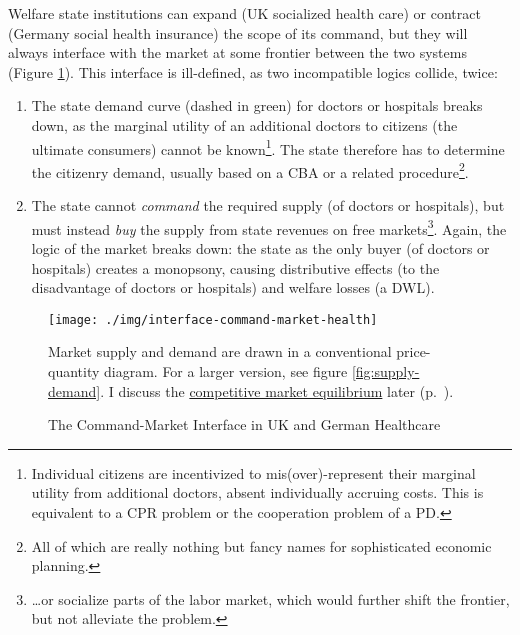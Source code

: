 Welfare state institutions can expand (UK socialized health care) or contract (Germany social health insurance) the scope of its command, but they will always interface with the market at some frontier between the two systems (Figure \ref{fig:interface-command-market-health}). This interface is ill-defined, as two incompatible logics collide, twice:
\begin{enumerate}
	\item The state demand curve (dashed in green) for doctors or hospitals breaks down, as the marginal utility of an additional doctors to citizens (the ultimate consumers) cannot be known\footnote
		{Individual citizens are incentivized to mis(over)-represent their marginal utility from additional doctors, absent individually accruing costs. This is equivalent to a \gls{CPR} problem or the cooperation problem of a \gls{PD}.}.
	The state therefore has to determine the citizenry demand, usually based on a \gls{CBA} or a related procedure\footnote
		{All of which are really nothing but fancy names for sophisticated economic planning.}.
	\item The state cannot \emph{command} the required supply (of doctors or hospitals), but must instead \emph{buy} the supply from state revenues on free markets\footnote{
	\ldots or socialize parts of the labor market, which would further shift the frontier, but not alleviate the problem.
}.
	Again, the logic of the market breaks down: the state as the only buyer (of doctors or hospitals) creates a monopsony, causing distributive effects (to the disadvantage of doctors or hospitals) and welfare losses (a \gls{DWL}).
\end{enumerate}

\begin{landscape}
 \begin{figure}[htbp]
	\begin{center}
	\texttt{[image: ./img/interface-command-market-health]}
	\caption[Command-Market Interface in UK and German Healthcare]{The Command-Market Interface in UK and German Healthcare}
	\label{fig:interface-command-market-health}
	\end{center}
	\scriptsize{Market supply and demand are drawn in a conventional price-quantity diagram. For a larger version, see figure \ref{fig:supply-demand}. I discuss the \hyperref[sec:market-solutions-production]{competitive market equilibrium} later (p.~\pageref{sec:market-solutions-production}).}
\end{figure}
\end{landscape}

